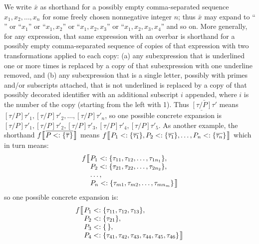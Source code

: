 We write $\bar{x}$ as shorthand for a possibly empty comma-separated sequence $x_1, x_2, \ldots, x_n$ for some freely chosen nonnegative integer $n$;
thus $\bar{x}$ may expand to `` '' or ``$x_1$'' or ``$x_1, x_2$'' or ``$x_1, x_2, x_3$'' or ``$x_1, x_2, x_3, x_4$'' and so on.
More generally, for any expression, that same expression with an overbar is shorthand for a possibly empty comma-separated sequence
of copies of that expression with two transformations applied to each copy: (a) any subexpression that is underlined one or more times
is replaced by a copy of that subexpression with one underline removed, and (b) any subexpression that is a single letter, possibly with primes and/or subscripts attached, that is not underlined
is replaced by a copy of that possibly decorated identifier with an additional subscript $i$ appended, where $i$ is the number of the copy (starting from the left with 1). Thus $\bar{\underline{[\tau/P]}\tau'}$ means $[\tau/P]\tau'_1, [\tau/P]\tau'_2, \dots, [\tau/P]\tau'_n$,
so one possible concrete expansion is $[\tau/P]\tau'_1, [\tau/P]\tau'_2, [\tau/P]\tau'_3, [\tau/P]\tau'_4, [\tau/P]\tau'_5$.  As another example, the shorthand
$f\bigobb{P \extends \bdb{\tau}}$ means $f\bigob{P_1 \extends \bdb{\tau_1}, P_2 \extends \bdb{\tau_1}, \ldots, P_n \extends \bdb{\tau_n}}$ which in turn means:
\[ \begin{array}{l@{}l}
    f \big\llbracket \mskip0.5\thinmuskip & P_1 \extends \bd{\tau_{11}, \tau_{12}, \ldots, \tau_{1{n_1}}}, \\
                                          & P_2 \extends \bd{\tau_{21}, \tau_{22}, \ldots, \tau_{2{n_2}}}, \\
                                          & \ldots, \\
                                          & P_n \extends \bd{\tau_{m1}, \tau_{m2}, \ldots, \tau_{m{n_m}}} \mskip 0.5\thinmuskip \big\rrbracket
\end{array} \]
so one possible concrete expansion is:
\[ \begin{array}{l@{}l}
    f \big\llbracket \mskip0.5\thinmuskip & P_1 \extends \bd{\tau_{11}, \tau_{12}, \tau_{13}}, \\
                                          & P_2 \extends \bd{\tau_{21}}, \\
                                          & P_3 \extends \bd{\,}, \\
                                          & P_4 \extends \bd{\tau_{41}, \tau_{42}, \tau_{43}, \tau_{44}, \tau_{45}, \tau_{46}} \mskip 0.5\thinmuskip \big\rrbracket
\end{array} \]


